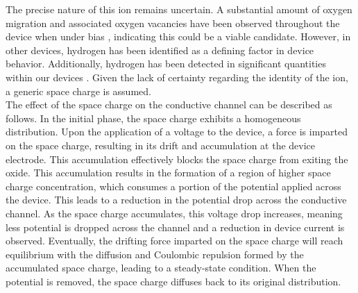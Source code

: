 \noindent The precise nature of this ion remains uncertain. A substantial amount of oxygen migration and associated oxygen vacancies have been observed throughout the device when under bias \cite{vanka2022hydrogen}, indicating this could be a viable candidate. However, in other devices, hydrogen has been identified as a defining factor in device behavior. Additionally, hydrogen has been detected in significant quantities within our devices \cite{lagarias1998convergence}. Given the lack of certainty regarding the identity of the ion, a generic space charge is assumed.\\




\noindent The effect of the space charge on the conductive channel can be described as follows. In the initial phase, the space charge exhibits a homogeneous distribution. Upon the application of a voltage to the device, a force is imparted on the space charge, resulting in its drift and accumulation at the device electrode. This accumulation effectively blocks the space charge from exiting the oxide. This accumulation results in the formation of a region of higher space charge concentration, which consumes a portion of the potential applied across the device. This leads to a reduction in the potential drop across the conductive channel. As the space charge accumulates, this voltage drop increases, meaning less potential is dropped across the channel and a reduction in device current is observed. Eventually, the drifting force imparted on the space charge will reach equilibrium with the diffusion and Coulombic repulsion formed by the accumulated space charge, leading to a steady-state condition. When the potential is removed, the space charge diffuses back to its original distribution.\\

